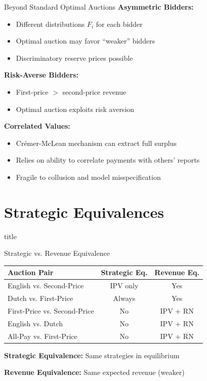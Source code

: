 \documentclass[xcolor={x11names}, aspectratio=169 ]{beamer}
\newcommand{\sectionslide}{%
  \begin{frame}
    \vfill
    \centering
    \begin{beamercolorbox}[sep=8pt,center,shadow=true,rounded=true]{title}
      \usebeamerfont{title}\insertsectionhead\par%
    \end{beamercolorbox}
    \vfill
  \end{frame}
}
\begin{document}
\begin{frame}{Beyond Standard Optimal Auctions}
\textbf{Asymmetric Bidders:}
\begin{itemize}
  \item Different distributions $F_i$ for each bidder
  \item Optimal auction may favor ``weaker'' bidders
  \item Discriminatory reserve prices possible
\end{itemize}

\textbf{Risk-Averse Bidders:}
\begin{itemize}
  \item First-price $>$ second-price revenue
  \item Optimal auction exploits risk aversion
\end{itemize}

\textbf{Correlated Values:}
\begin{itemize}
  \item Crémer-McLean mechanism can extract full surplus
  \item Relies on ability to correlate payments with others' reports
  \item Fragile to collusion and model misspecification
\end{itemize}
\end{frame}

\section{Strategic Equivalences}
\sectionslide

\begin{frame}{Strategic vs. Revenue Equivalence}
\begin{center}
\begin{tabular}{lcc}
\toprule
\textbf{Auction Pair} & \textbf{Strategic Eq.} & \textbf{Revenue Eq.} \\
\midrule
English vs. Second-Price & IPV only & Yes \\
Dutch vs. First-Price & \textcolor{green!70!black}{Always} & Yes \\
First-Price vs. Second-Price & No & IPV + RN \\
English vs. Dutch & No & IPV + RN \\
All-Pay vs. First-Price & No & IPV + RN \\
\bottomrule
\end{tabular}
\end{center}

\textbf{Strategic Equivalence:} Same strategies in equilibrium

\textbf{Revenue Equivalence:} Same expected revenue (weaker)
\end{frame}
\end{document}
